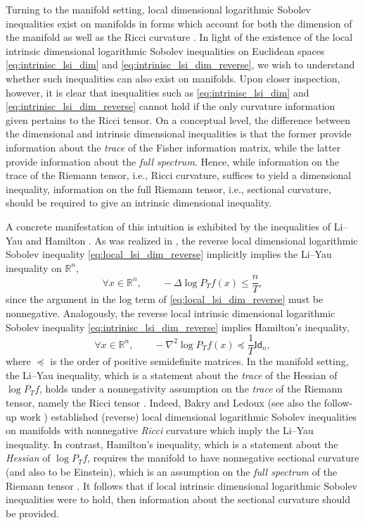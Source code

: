 \documentclass[a4paper,twoside,11pt,reqno]{amsart}
\newcommand{\R}{\mathbb{R}} %
\newcommand{\msf}{\mathsf}
\begin{document}
Turning to the manifold setting, local dimensional logarithmic Sobolev inequalities exist on manifolds in forms which account for both the dimension of the manifold as well as the Ricci curvature \cite{BBL17}. In light of the existence of the local intrinsic dimensional logarithmic Sobolev inequalities on Euclidean spaces \eqref{eq:intrinisc_lsi_dim} and \eqref{eq:intrinisc_lsi_dim_reverse}, we wish to understand whether such inequalities can also exist on manifolds. Upon closer inspection, however, it is clear that inequalities such as \eqref{eq:intrinisc_lsi_dim} and \eqref{eq:intrinisc_lsi_dim_reverse} cannot hold if the only curvature information given pertains to the Ricci tensor. On a conceptual level, the difference between the dimensional and intrinsic dimensional inequalities is that the former provide information about the \emph{trace} of the Fisher information matrix, while the latter provide information about the \emph{full spectrum}. Hence,  while information on the trace of the Riemann tensor, i.e., Ricci curvature,  suffices to yield a dimensional inequality, information on the full Riemann tensor, i.e., sectional curvature,  should be required to give an intrinsic dimensional inequality.






A concrete manifestation of this intuition is exhibited by the inequalities of Li--Yau and Hamilton \cite{LY86,Ham93}. As was realized in \cite{BL06}, the reverse  local dimensional logarithmic Sobolev inequality \eqref{eq:local_lsi_dim_reverse} implicitly implies the Li--Yau inequality on $\R^n$,
\begin{equation}\label{eq:Li-Yau}
\forall x\in \R^n, \qquad -\Delta \log P_Tf(x)\le \frac{n}{T},
\end{equation}
since the argument in the log term of \eqref{eq:local_lsi_dim_reverse} must be nonnegative. Analogously, the reverse  local intrinsic dimensional logarithmic Sobolev inequality \eqref{eq:intrinisc_lsi_dim_reverse} implies Hamilton's inequality,
\begin{equation}\label{eq:Hamilton}
\forall x\in \R^n, \qquad-\nabla^2 \log P_Tf(x) \preceq\frac{1}{T}\msf{Id}_n,
\end{equation}
where $\preceq$ is the order of positive semidefinite matrices.  In the manifold setting, the  Li--Yau inequality, which is a statement about the \emph{trace} of the Hessian of $\log P_Tf$, holds under a nonnegativity assumption on the \emph{trace} of the Riemann tensor, namely the Ricci tensor \cite{LY86,YZ20}. Indeed,  Bakry and Ledoux \cite{BL06} (see also the follow-up work \cite{BBL17}) established (reverse) local dimensional logarithmic Sobolev inequalities on manifolds with nonnegative \emph{Ricci} curvature which imply the Li--Yau inequality. In contrast, Hamilton's inequality, which is a statement about the \emph{Hessian} of $\log P_Tf$, requires the manifold to have nonnegative sectional curvature (and also to be  Einstein), which is an assumption on the \emph{full spectrum} of the Riemann tensor \cite{Ham93}. It follows that if local intrinsic dimensional logarithmic Sobolev inequalities were to hold, then information about the sectional curvature should be provided.
\end{document}
